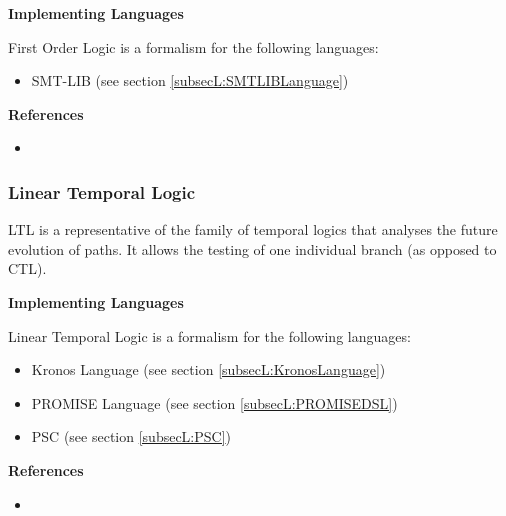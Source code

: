 \textbf{Implementing Languages}

First Order Logic is a formalism for the following languages:
\begin{itemize}
	\item SMT-LIB (see section \ref{subsecL:SMTLIBLanguage})
\end{itemize}




\itemCpsUsage {}


\textbf{References}
\begin{itemize}
	
\item {}
\end{itemize}



\subsubsection{Linear Temporal Logic}
\label{subsecF:LTL}


LTL is a representative of the family of temporal logics that analyses the future evolution of paths. It allows the testing of one individual branch (as opposed to CTL).

\textbf{Implementing Languages}

Linear Temporal Logic is a formalism for the following languages:
\begin{itemize}
	\item Kronos Language (see section \ref{subsecL:KronosLanguage})
	\item PROMISE Language (see section \ref{subsecL:PROMISEDSL})
	\item PSC (see section \ref{subsecL:PSC})
\end{itemize}





\textbf{References}
\begin{itemize}
	
\item {}
\end{itemize}



